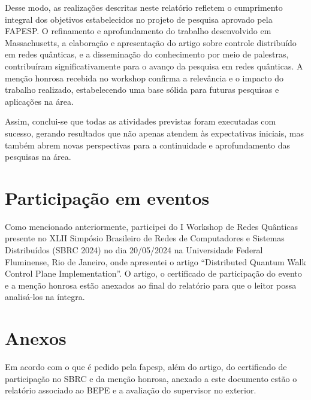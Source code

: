 \documentclass{article}
\begin{document}
    Desse modo, as realizações descritas neste relatório refletem o cumprimento integral dos objetivos estabelecidos no projeto de pesquisa aprovado pela FAPESP. O refinamento e aprofundamento do trabalho desenvolvido em Massachusetts, a elaboração e apresentação do artigo sobre controle distribuído em redes quânticas, e a disseminação do conhecimento por meio de palestras, contribuíram significativamente para o avanço da pesquisa em redes quânticas. A menção honrosa recebida no workshop confirma a relevância e o impacto do trabalho realizado, estabelecendo uma base sólida para futuras pesquisas e aplicações na área.
    
    Assim, conclui-se que todas as atividades previstas foram executadas com sucesso, gerando resultados que não apenas atendem às expectativas iniciais, mas também abrem novas perspectivas para a continuidade e aprofundamento das pesquisas na área.
    

\section{Participação em eventos}
    Como mencionado anteriormente, participei do I Workshop de Redes Quânticas presente no XLII Simpósio Brasileiro de Redes de Computadores e Sistemas Distribuídos (SBRC 2024) no dia 20/05/2024 na Universidade Federal Fluminense, Rio de Janeiro, onde apresentei o artigo ``Distributed Quantum Walk Control Plane Implementation''. O artigo, o certificado de participação do evento e a menção honrosa estão anexados ao final do relatório para que o leitor possa analisá-los na íntegra.

\section{Anexos}
    Em acordo com o que é pedido pela fapesp, além do artigo, do certificado de participação no SBRC e da menção honrosa, anexado a este documento estão o relatório associado ao BEPE e a avaliação do supervisor no exterior.


\pagebreak
\printbibliography[]
\end{document}
